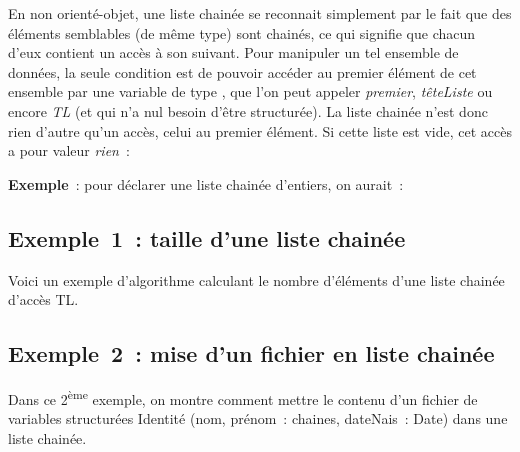 	En non orienté-objet, une liste chainée se reconnait simplement 
	par le fait que des éléments semblables (de même type)
	sont chainés, ce qui signifie que chacun d'eux contient un accès 
	à son suivant. Pour manipuler un tel ensemble de
	données, la seule condition est de pouvoir accéder au premier 
	élément de cet ensemble par une variable de type ,
	que l'on peut appeler \textit{premier}, \textit{têteListe} ou encore 
	\textit{TL} (et qui n'a nul besoin d'être
	structurée). La liste chainée n'est donc rien d'autre qu'un accès, 
	celui au premier élément. Si cette liste est vide,
	cet accès a pour valeur \textit{rien}~:


	\textbf{Exemple}~: pour déclarer une liste chainée d'entiers, on aurait~:


	\subsection{Exemple~1~: taille d'une liste chainée}
	
		Voici un exemple d'algorithme calculant le nombre 
		d'éléments d'une liste chainée d'accès TL.
		
			
	\subsection{Exemple~2~: mise d'un fichier en liste chainée}
		
		Dans ce 2\textsuperscript{ème} exemple, on montre comment mettre 
		le contenu d'un fichier de variables structurées
		Identité (nom, prénom~: chaines, dateNais~: Date) dans une liste chainée.
		
